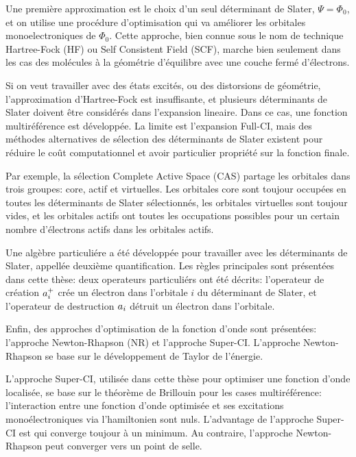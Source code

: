 Une premi\`ere approximation est le choix d'un seul d\'eterminant de Slater,
$\Psi = \Phi_0$, et on utilise une proc\'edure d'optimisation qui va am\'eliorer les
orbitales monoelectroniques de $\Phi_0$.  Cette approche, bien connue sous
le nom de technique Hartree-Fock (HF) ou Self Consistent Field (SCF), marche
bien seulement dans les cas des mol\'ecules \`a la g\'eom\'etrie
d'\'equilibre avec une couche ferm\'e d'\'electrons. 

Si on veut travailler avec des \'etats excit\'es, ou des distorsions de
g\'eom\'etrie, l'approximation d'Hartree-Fock est insuffisante, et plusieurs
d\'eterminants de Slater doivent \^etre consid\'er\'es dans l'expansion lineaire.
Dans ce cas, une fonction multir\'ef\'erence est d\'evelopp\'ee. La limite est
l'expansion Full-CI, mais des m\'ethodes alternatives de s\'election des
d\'eterminants de Slater existent pour r\'eduire le co\^ut computationnel et avoir
particulier propri\'et\'e sur la fonction finale. 

Par exemple, la s\'election Complete Active Space (CAS) partage les
orbitales dans trois groupes: core, actif et virtuelles. Les orbitales core
sont toujour occup\'ees en toutes les d\'eterminants de Slater
s\'electionn\'es, les orbitales virtuelles sont toujour vides, et les
orbitales actifs ont toutes les occupations possibles pour un certain nombre
d'\'electrons actifs dans les orbitales actifs. 

Une alg\`ebre particuli\'ere a \'et\'e d\'evelopp\'ee pour travailler avec
les d\'eterminants de Slater, appell\'ee deuxi\`eme quantification. Les r\`egles
principales sont pr\'esent\'ees dans cette th\`ese: deux operateurs
particuli\'ers ont \'et\'e d\'ecrits: l'operateur de cr\'eation $a_{i}^{+}$
cr\'ee un \'electron dans l'orbitale $i$ du d\'eterminant de Slater, et
l'operateur de destruction $a_{i}$ d\'etruit un \'electron dans
l'orbitale.

Enfin, des approches d'optimisation de la fonction d'onde sont
pr\'esent\'ees: l'approche Newton-Rhapson (NR) et l'approche Super-CI. 
L'approche Newton-Rhapson se base sur le d\'eveloppement de Taylor de
l'\'energie. 

L'approche Super-CI, utilis\'ee dans cette th\`ese pour optimiser une
fonction d'onde localis\'ee, se base sur le th\'eor\`eme de Brillouin pour
les cases multir\'ef\'erence: l'interaction entre une fonction d'onde
optimis\'ee et ses excitations mono\'electroniques via l'hamiltonien sont
nuls. L'advantage de l'approche Super-CI est qui converge toujour \`a un
minimum. Au contraire, l'approche Newton-Rhapson peut converger vers un
point de selle.
